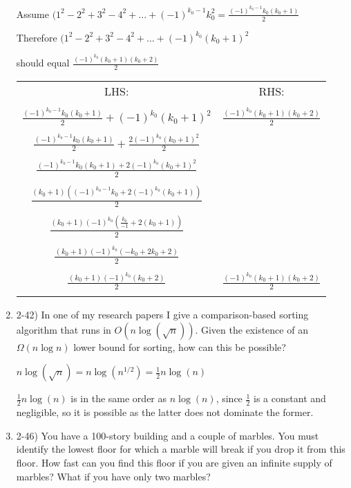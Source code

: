 \documentclass{article}
\begin{document}
\begin{enumerate}
        Assume $ (1^2-2^2+3^2-4^2+...+(-1)^{k_0-1}k_0^2 = \frac{(-1)^{k_0-1}k_0(k_0+1)}{2} $

        Therefore $ (1^2-2^2+3^2-4^2+...+(-1)^{k_0}(k_0+1)^2 $ 
        
        should equal $ \frac{(-1)^{k_0}(k_0+1)(k_0+2)}{2} $

    \begin{center}
        \begin{tabular}{ c | c } 
        LHS: & RHS: \\ \\
        $ \frac{(-1)^{k_0-1}k_0(k_0+1)}{2} + (-1)^{k_0}(k_0+1)^2 $ & $ \frac{(-1)^{k_0}(k_0+1)(k_0+2)}{2} $ \\ \\
        $ \frac{(-1)^{k_0-1}k_0(k_0+1)}{2} + \frac{2(-1)^{k_0}(k_0+1)^2}{2} $ &  \\ \\
        $ \frac{(-1)^{k_0-1}k_0(k_0+1) + 2(-1)^{k_0}(k_0+1)^2}{2}  $ &  \\ \\
        $ \frac{(k_0+1)((-1)^{k_0-1}k_0+2(-1)^{k_0}(k_0+1))}{2}  $ &  \\ \\
        $ \frac{(k_0+1)(-1)^{k_0}(\frac{k_0}{-1}+2(k_0+1))}{2}  $ &  \\ \\
        $ \frac{(k_0+1)(-1)^{k_0}(-k_0+2k_0+2)}{2}  $ &  \\ \\
        $ \boxed{\frac{(k_0+1)(-1)^{k_0}(k_0+2)}{2}}  $ &  $\boxed{\frac{(-1)^{k_0}(k_0+1)(k_0+2)}{2}}$\\ \\
        \end{tabular}
    \end{center}
    
    \item 2-42) In one of my research papers I give a comparison-based sorting algorithm that runs in $O(n \log(\sqrt{n}))$. Given the existence of an $\Omega(n \log n)$ lower bound for sorting, how can this be possible?
    
    \(n \log(\sqrt{n}) = n \log(n^{1/2}) = \frac{1}{2} n \log(n)\)

    \(\frac{1}{2} n \log(n) \) is in the same order as \(n \log(n)\), since \(\frac{1}{2}\) is a constant and negligible, so it is possible as the latter does not dominate the former.
    
    \item 2-46) You have a 100-story building and a couple of marbles. You must identify the lowest floor for which a marble will break if you drop it from this floor. How fast can you find this floor if you are given an infinite supply of marbles? What if you have only two marbles?


\end{enumerate}
\end{document}
